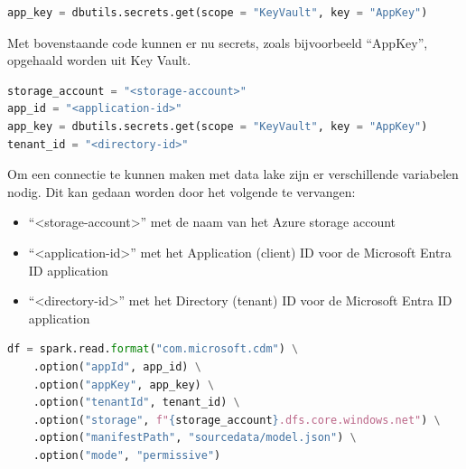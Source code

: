 \begin{lstlisting}[language=Python, caption={Ophalen van secrets uit Key Vault in Azure Databricks.}, style=myStyle]
app_key = dbutils.secrets.get(scope = "KeyVault", key = "AppKey")
\end{lstlisting}

Met bovenstaande code kunnen er nu secrets, zoals bijvoorbeeld ``AppKey'', opgehaald worden uit Key Vault.



\begin{lstlisting}[language=Python, caption={Variabelen voor het connecteren met Azure Data Lake in Azure Databricks.}, style=myStyle]
storage_account = "<storage-account>"
app_id = "<application-id>"
app_key = dbutils.secrets.get(scope = "KeyVault", key = "AppKey")
tenant_id = "<directory-id>"
\end{lstlisting}


Om een connectie te kunnen maken met data lake zijn er verschillende variabelen nodig. Dit kan gedaan worden door het volgende te vervangen:

\begin{itemize}
    \item ``<storage-account>'' met de naam van het Azure storage account
    \item ``<application-id>'' met het Application (client) ID voor de Microsoft Entra ID application
    \item ``<directory-id>'' met het Directory (tenant) ID voor de Microsoft Entra ID application
\end{itemize}



\begin{lstlisting}[language=Python, caption={Initialiseren van DataFrame in Azure Databricks.}, style=myStyle]
df = spark.read.format("com.microsoft.cdm") \
    .option("appId", app_id) \
    .option("appKey", app_key) \
    .option("tenantId", tenant_id) \
    .option("storage", f"{storage_account}.dfs.core.windows.net") \
    .option("manifestPath", "sourcedata/model.json") \
    .option("mode", "permissive")
\end{lstlisting}

